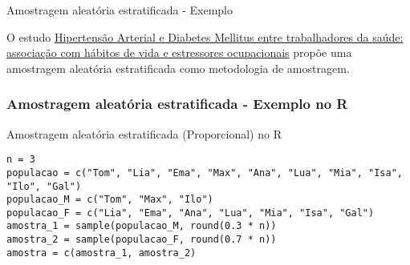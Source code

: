 \begin{frame}{Amostragem aleatória estratificada - Exemplo}
    \begin{exemplo}
    O estudo \href{https://www.scielo.br/j/rbso/a/bMg5nzYYqSBGWCjZrzjhYPb/}{Hipertensão Arterial e Diabetes Mellitus entre trabalhadores da saúde: associação com hábitos de vida
    e estressores ocupacionais} propõe uma amostragem aleatória estratificada como metodologia de amostragem.     
    \end{exemplo}
   
\end{frame}

\begin{frame}[fragile]
\frametitle{Amostragem aleatória estratificada - Exemplo no R}
\begin{block}{Amostragem aleatória estratificada (Proporcional) no R}
\begin{verbatim}
n = 3
populacao = c("Tom", "Lia", "Ema", "Max", "Ana", "Lua", "Mia", "Isa", "Ilo", "Gal")
populacao_M = c("Tom", "Max", "Ilo")
populacao_F = c("Lia", "Ema", "Ana", "Lua", "Mia", "Isa", "Gal")
amostra_1 = sample(populacao_M, round(0.3 * n))
amostra_2 = sample(populacao_F, round(0.7 * n))
amostra = c(amostra_1, amostra_2)
\end{verbatim}
\end{block}
\end{frame}


